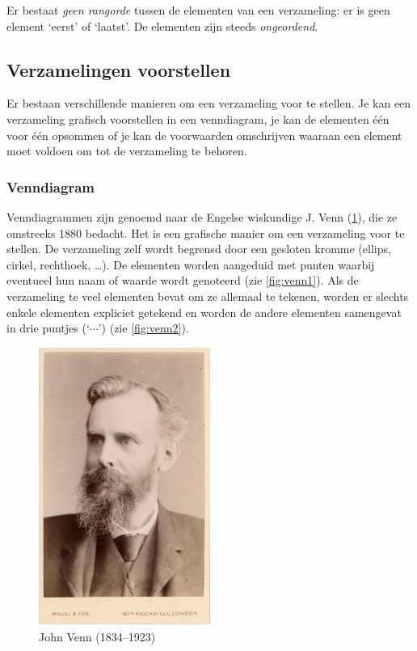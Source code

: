 Er bestaat \emph{geen rangorde} tussen de elementen van een verzameling: er is geen element `eerst' of `laatst'. De elementen zijn steeds \emph{ongeordend}. 

\subsection{Verzamelingen voorstellen}
Er bestaan verschillende manieren om een verzameling voor te stellen. Je kan een verzameling grafisch voorstellen in een venndiagram, je kan de elementen \'e\'en voor \'e\'en opsommen of je kan de voorwaarden omschrijven waaraan een element moet voldoen om tot de verzameling te behoren.

\subsubsection{Venndiagram}
Venndiagrammen zijn genoemd naar de Engelse wiskundige J. Venn (\cref{fig:venn}), die ze omstreeks 1880 bedacht. Het is een grafische manier om een verzameling voor te stellen. De verzameling zelf wordt begrensd door een gesloten kromme (ellips, cirkel, rechthoek, \dots). De elementen worden aangeduid met punten waarbij eventueel hun naam of waarde wordt genoteerd (zie \cref{fig:venn1}). Als de verzameling te veel elementen bevat om ze allemaal te tekenen, worden er slechts enkele elementen expliciet getekend en worden de andere elementen samengevat in drie puntjes (`$\cdots$') (zie \cref{fig:venn2}).

\begin{figure}[htbp]
\centering
\includegraphics[width=0.5\textwidth]{figuren/verzamelingen_relaties/venn.jpg}
\caption{John Venn (1834--1923)}
\label{fig:venn}
\end{figure}

